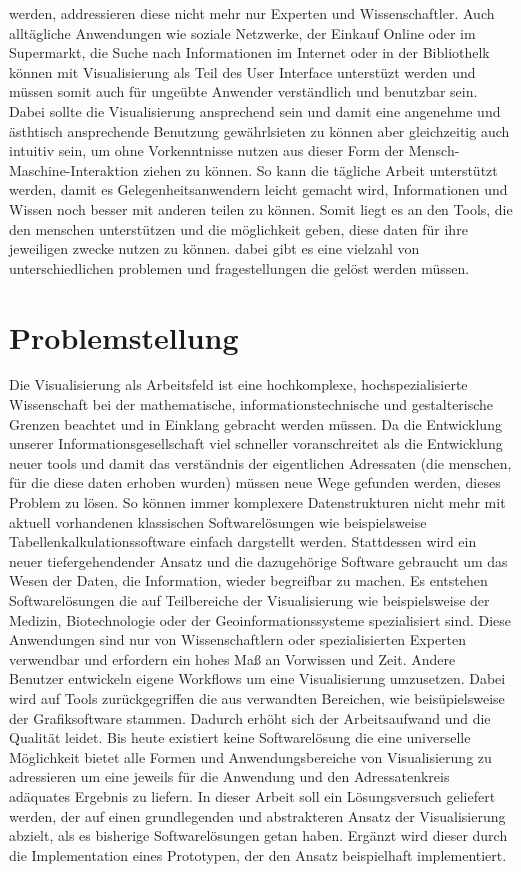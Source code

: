 \documentclass[a4paper, 12pt, onepage, pdftex, headsepline, footsepline]{scrreprt}
\begin{document}
werden, addressieren diese nicht mehr nur Experten und Wissenschaftler. Auch alltägliche Anwendungen
wie soziale Netzwerke, der Einkauf Online oder im Supermarkt, die Suche nach Informationen im
Internet oder in der Bibliothelk können mit Visualisierung als Teil des User Interface unterstüzt
werden und müssen somit auch für ungeübte Anwender verständlich und benutzbar sein. Dabei sollte
die Visualisierung ansprechend sein und damit eine angenehme und ästhtisch ansprechende Benutzung
gewährlsieten zu können aber gleichzeitig auch intuitiv sein, um ohne Vorkenntnisse nutzen aus
dieser Form der Mensch-Maschine-Interaktion ziehen zu können. So kann die tägliche Arbeit
unterstützt werden, damit es Gelegenheitsanwendern leicht gemacht wird, Informationen und
Wissen noch besser mit anderen teilen zu können. Somit liegt es an den Tools, die den menschen
unterstützen und die möglichkeit geben, diese daten für ihre jeweiligen zwecke nutzen zu können.
dabei gibt es eine vielzahl von unterschiedlichen problemen und fragestellungen die gelöst werden
müssen.

\section{Problemstellung}
Die Visualisierung als Arbeitsfeld ist eine hochkomplexe, hochspezialisierte Wissenschaft bei der
mathematische, informationstechnische und gestalterische Grenzen beachtet und in Einklang gebracht
werden müssen. Da die Entwicklung unserer Informationsgesellschaft viel schneller voranschreitet als
die Entwicklung neuer tools und damit das verständnis der eigentlichen Adressaten (die menschen, für
die diese daten erhoben wurden) müssen neue Wege gefunden werden, dieses Problem zu lösen. So können
immer komplexere Datenstrukturen nicht mehr mit aktuell vorhandenen klassischen Softwarelösungen wie 
beispielsweise Tabellenkalkulationssoftware
einfach dargstellt werden. Stattdessen wird ein neuer tiefergehendender Ansatz und die dazugehörige
Software gebraucht um das Wesen der Daten, die Information, wieder begreifbar zu machen.
Es entstehen Softwarelösungen die auf Teilbereiche der Visualisierung wie beispielsweise der Medizin,
Biotechnologie oder der Geoinformationssysteme spezialisiert sind. Diese Anwendungen sind nur von
Wissenschaftlern oder spezialisierten Experten verwendbar und erfordern ein hohes Maß an Vorwissen
und Zeit.
Andere Benutzer entwickeln eigene Workflows um eine Visualisierung umzusetzen.
Dabei wird auf Tools zurückgegriffen die aus verwandten Bereichen, wie beisüpielsweise der Grafiksoftware stammen.
Dadurch erhöht sich der Arbeitsaufwand und die Qualität leidet. Bis heute existiert keine
Softwarelösung die eine universelle Möglichkeit bietet alle Formen und Anwendungsbereiche von
Visualisierung zu adressieren um eine jeweils für die Anwendung und den Adressatenkreis adäquates
Ergebnis zu liefern.
In dieser Arbeit soll ein Lösungsversuch geliefert werden, der auf einen grundlegenden und
abstrakteren Ansatz der Visualisierung abzielt, als es bisherige Softwarelösungen getan haben.
Ergänzt wird dieser durch die Implementation eines Prototypen, der den Ansatz beispielhaft
implementiert.
\end{document}
